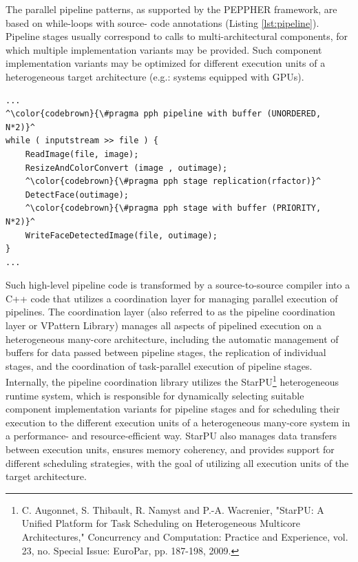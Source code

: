 \documentclass[11pt,a4paper, oneside]{book} %
\begin{document}

The parallel pipeline patterns, as supported by the PEPPHER framework, are based on while-loops with source-
code annotations (Listing \ref{lst:pipeline}). Pipeline stages usually correspond to calls to multi-architectural
components, for which multiple implementation variants may be provided. Such component implementation
variants may be optimized for different execution units of a heterogeneous target architecture (e.g.: systems
equipped with GPUs).
\newline
\newline
\newline


\lstset{label=lst:pipeline, caption="Example of a high-level pipeline pattern code for image processing. Pipeline consists of four stages. For the compute intensive DetectFace stage different component implementation variants for GPU and CPU exist and the PTF determines the best replication factor such that all execution units of the target architecture are exploited and execution time is minimized."}

\begin{lstlisting}
...
^\color{codebrown}{\#pragma pph pipeline with buffer (UNORDERED, N*2)}^
while ( inputstream >> file ) {
	ReadImage(file, image);
	ResizeAndColorConvert (image , outimage);
	^\color{codebrown}{\#pragma pph stage replication(rfactor)}^
	DetectFace(outimage);
	^\color{codebrown}{\#pragma pph stage with buffer (PRIORITY, N*2)}^
	WriteFaceDetectedImage(file, outimage);
}
...
\end{lstlisting}


Such high-level pipeline code is transformed by a source-to-source compiler into a C++ code that utilizes a
coordination layer for managing parallel execution of pipelines. The coordination layer  (also referred to as
the pipeline coordination layer or VPattern Library) manages
all aspects of pipelined execution on a heterogeneous many-core architecture, including the automatic
management of buffers for data passed between pipeline stages, the replication of individual stages, and
the coordination of task-parallel execution of pipeline stages. Internally, the pipeline coordination library
utilizes the StarPU\footnote{C. Augonnet, S. Thibault, R. Namyst and P.-A. Wacrenier, "StarPU: A Unified
Platform for Task Scheduling on Heterogeneous Multicore Architectures," Concurrency and Computation:
Practice and Experience, vol. 23, no. Special Issue: EuroPar, pp. 187-198, 2009.} heterogeneous runtime
system, which is responsible for dynamically selecting suitable component implementation variants for
pipeline stages and for scheduling their execution to the different execution units of a heterogeneous
many-core system in a performance- and resource-efficient way. StarPU also manages data transfers
between execution units, ensures memory coherency, and provides support for different scheduling
strategies, with the goal of utilizing all execution units of the target architecture.
\end{document}
